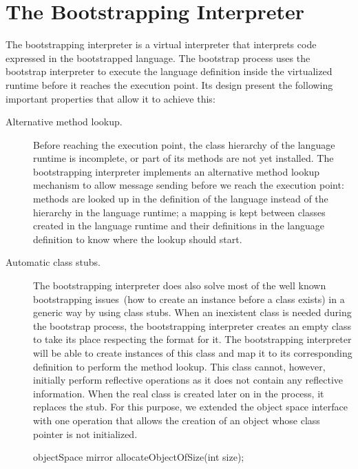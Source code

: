 \section{The Bootstrapping Interpreter}\label{sec:ast_interpreter}

The bootstrapping interpreter is a virtual interpreter that interprets code expressed in the bootstrapped language. The bootstrap process uses the bootstrap interpreter to execute the language definition inside the virtualized runtime before it reaches the execution point. Its design present the following important properties that allow it to achieve this:

\begin{description}
\item[Alternative method lookup.] Before reaching the execution point, the class hierarchy of the language runtime is incomplete, or part of its methods are not yet installed. The bootstrapping interpreter implements an alternative method lookup mechanism to allow message sending before we reach the execution point: methods are looked up in the definition of the language instead of the hierarchy in the language runtime; a mapping is kept between classes created in the language runtime and their definitions in the language definition to know where the lookup should start.

\item[Automatic class stubs.] The bootstrapping interpreter does also solve most of the well known bootstrapping issues~(\eg how to create an instance before a class exists) in a generic way by using class stubs. When an inexistent class is needed during the bootstrap process, the bootstrapping interpreter creates an empty class to take its place respecting the \VM format for it. The bootstrapping interpreter will be able to create instances of this class and map it to its corresponding definition to perform the method lookup. This class cannot, however, initially perform reflective operations as it does not contain any reflective information. When the real class is created later on in the process, it replaces the stub. For this purpose, we extended the object space interface with one operation that allows the creation of an object whose class pointer is not initialized.

\begin{code}
objectSpace {
    mirror allocateObjectOfSize(int size);
}
\end{code}

\end{description}

